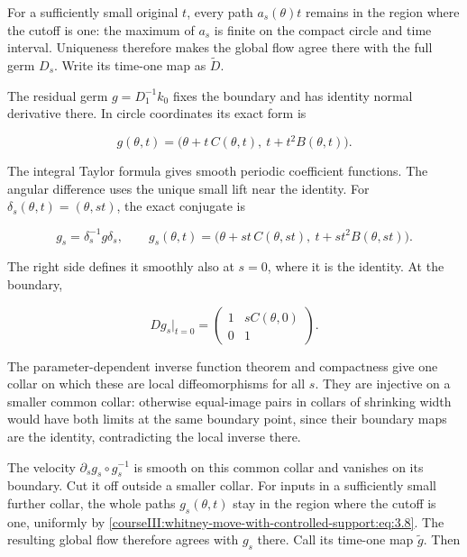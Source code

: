 For a sufficiently small original \(t\), every path \(a_s(\theta)t\) remains in the region where the cutoff is one: the maximum of \(a_s\) is finite on the compact circle and time interval. Uniqueness therefore makes the global flow agree there with the full germ \(D_s\). Write its time-one map as \(\widetilde D\).

The residual germ \(g=D_1^{-1}k_0\) fixes the boundary and has identity normal derivative there. In circle coordinates its exact form is

\begin{equation}
g(\theta,t)=
\bigl(\theta+t\,C(\theta,t),\
       t+t^2 B(\theta,t)\bigr).
\label{courseIII:whitney-move-with-controlled-support:eq:3.7}
\end{equation}

The integral Taylor formula gives smooth periodic coefficient functions. The angular difference uses the unique small lift near the identity. For \(\delta_s(\theta,t)=(\theta,st)\), the exact conjugate is

\begin{equation}
g_s=\delta_s^{-1}g\delta_s,\qquad
g_s(\theta,t)=
\bigl(\theta+s t\,C(\theta,st),\
       t+s t^2B(\theta,st)\bigr).
\label{courseIII:whitney-move-with-controlled-support:eq:3.8}
\end{equation}

The right side defines it smoothly also at \(s=0\), where it is the identity. At the boundary,

\begin{equation}
Dg_s|_{t=0}=
\begin{pmatrix}1&sC(\theta,0)\\0&1\end{pmatrix}.
\label{courseIII:whitney-move-with-controlled-support:eq:3.9}
\end{equation}

The parameter-dependent inverse function theorem and compactness give one collar on which these are local diffeomorphisms for all \(s\). They are injective on a smaller common collar: otherwise equal-image pairs in collars of shrinking width would have both limits at the same boundary point, since their boundary maps are the identity, contradicting the local inverse there.

The velocity \(\partial_sg_s\circ g_s^{-1}\) is smooth on this common collar and vanishes on its boundary. Cut it off outside a smaller collar. For inputs in a sufficiently small further collar, the whole paths \(g_s(\theta,t)\) stay in the region where the cutoff is one, uniformly by \eqref{courseIII:whitney-move-with-controlled-support:eq:3.8}. The resulting global flow therefore agrees with \(g_s\) there. Call its time-one map \(\widetilde g\). Then


